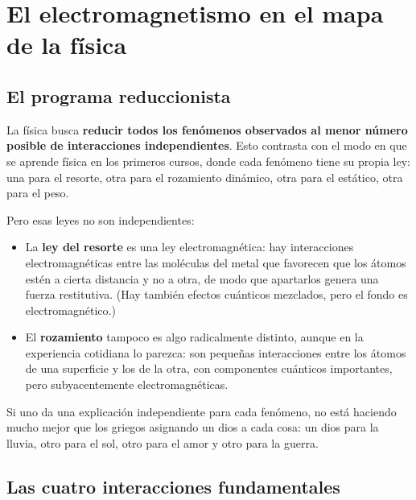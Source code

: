 \documentclass[12pt,a4paper]{article}
\begin{document}
\section{El electromagnetismo en el mapa de la física}

\subsection{El programa reduccionista}

La física busca \textbf{reducir todos los fenómenos observados al menor número
posible de interacciones independientes}. Esto contrasta con el modo en que se
aprende física en los primeros cursos, donde cada fenómeno tiene su propia ley:
una para el resorte, otra para el rozamiento dinámico, otra para el estático,
otra para el peso.

Pero esas leyes no son independientes:

\begin{itemize}
  \item La \textbf{ley del resorte} es una ley electromagnética: hay
        interacciones electromagnéticas entre las moléculas del metal que
        favorecen que los átomos estén a cierta distancia y no a otra, de modo
        que apartarlos genera una fuerza restitutiva. (Hay también efectos
        cuánticos mezclados, pero el fondo es electromagnético.)
  \item El \textbf{rozamiento} tampoco es algo radicalmente distinto, aunque en
        la experiencia cotidiana lo parezca: son pequeñas interacciones entre los
        átomos de una superficie y los de la otra, con componentes cuánticos
        importantes, pero subyacentemente electromagnéticas.
\end{itemize}

\begin{keybox}
Si uno da una explicación independiente para cada fenómeno, no está haciendo
mucho mejor que los griegos asignando un dios a cada cosa: un dios para la
lluvia, otro para el sol, otro para el amor y otro para la guerra.
\end{keybox}

\subsection{Las cuatro interacciones fundamentales}
\end{document}

